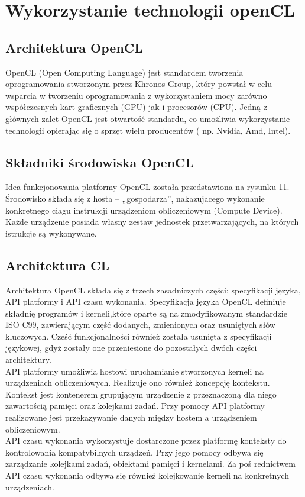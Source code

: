 \chapter{Wykorzystanie technologii openCL}
\label{t:int}

\section{Architektura OpenCL}
OpenCL (Open Computing Language) jest standardem tworzenia oprogramowania stworzonym przez Khronos Group, który powstał w celu wsparcia w tworzeniu oprogramowania z wykorzystaniem mocy zarówno współczesnych kart graficznych (GPU) jak i procesorów (CPU). Jedną z głównych zalet OpenCL jest otwartość standardu, co umożliwia wykorzystanie technologii opierając się o sprzęt wielu producentów ( np. Nvidia, Amd, Intel).

\section{Składniki środowiska OpenCL}
Idea funkcjonowania platformy OpenCL została przedstawiona na rysunku 11. \\
Środowisko składa się z hosta – „gospodarza”, nakazujacego wykonanie konkretnego ciagu instrukcji urządzeniom obliczeniowym (Compute Device). Każde urządzenie posiada własny zestaw jednostek przetwarzających, na których istrukcje są wykonywane.

\section{Architektura CL}
Architektura OpenCL składa się z trzech zasadniczych części: specyfikacji języka, API platformy i API czasu wykonania. Specyfikacja języka OpenCL definiuje składnię programów i kerneli,które oparte są na zmodyfikowanym standardzie ISO C99, zawierającym część dodanych, zmienionych oraz usuniętych słów kluczowych. Cześć funkcjonalności również została usunięta z specyfikacji językowej, gdyż zostały one przeniesione do pozostałych dwóch części architektury. \\
API platformy umożliwia hostowi uruchamianie stworzonych kerneli na urządzeniach obliczeniowych. Realizuje ono również koncepcję kontekstu. Kontekst jest kontenerem grupującym urządzenie z przeznaczoną dla niego zawartością pamięci oraz kolejkami zadań. Przy pomocy API platformy realizowane jest przekazywanie danych między hostem a urządzeniem obliczeniowym. \\
API czasu wykonania wykorzystuje dostarczone przez platformę konteksty do kontrolowania kompatybilnych urządzeń. Przy jego pomocy odbywa się zarządzanie kolejkami zadań, obiektami pamięci i kernelami. Za poś rednictwem API czasu wykonania odbywa się również kolejkowanie kerneli na konkretnych urządzeniach.

